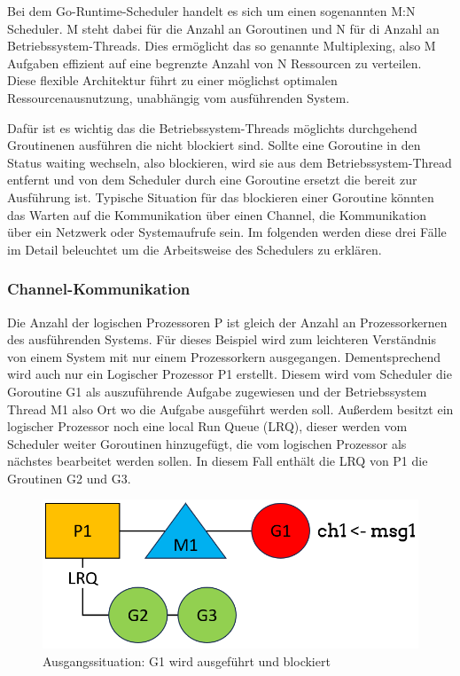 \documentclass[fontsize=12pt,paper=a4,twoside=semi,parskip=half-,headsepline,headinclude]{scrreprt}
\begin{document}
Bei dem Go-Runtime-Scheduler handelt es sich um einen sogenannten M:N Scheduler. M steht dabei für die Anzahl an Goroutinen und N für di Anzahl an Betriebssystem-Threads. Dies ermöglicht das so genannte Multiplexing, also M Aufgaben effizient auf eine begrenzte Anzahl von N Ressourcen zu verteilen. Diese flexible Architektur führt zu einer möglichst optimalen Ressourcenausnutzung, unabhängig vom ausführenden System.

Dafür ist es wichtig das die Betriebssystem-Threads möglichts durchgehend Groutinenen ausführen die nicht blockiert sind. Sollte eine Goroutine in den Status waiting wechseln, also blockieren, wird sie aus dem Betriebssystem-Thread entfernt und von dem Scheduler durch eine Goroutine ersetzt die bereit zur Ausführung ist. Typische Situation für das blockieren einer Goroutine könnten das Warten auf die Kommunikation über einen Channel, die Kommunikation über ein Netzwerk oder Systemaufrufe sein. Im folgenden werden diese drei Fälle im Detail beleuchtet um die Arbeitsweise des Schedulers zu erklären.

\subsubsection{Channel-Kommunikation}

Die Anzahl der logischen Prozessoren P ist gleich der Anzahl an Prozessorkernen des ausführenden Systems. Für dieses Beispiel wird zum leichteren Verständnis von einem System mit nur einem Prozessorkern ausgegangen. Dementsprechend wird auch nur ein Logischer Prozessor P1 erstellt. Diesem wird vom Scheduler die Goroutine G1 als auszuführende Aufgabe zugewiesen und der Betriebssystem Thread M1 also Ort wo die Aufgabe ausgeführt werden soll. Außerdem besitzt ein logischer Prozessor noch eine local Run Queue (LRQ), dieser werden vom Scheduler weiter Goroutinen hinzugefügt, die vom logischen Prozessor als nächstes bearbeitet werden sollen. In diesem Fall enthält die LRQ von P1 die Groutinen G2 und G3.

\begin{figure}[h]
	\centering
	\includegraphics[scale=0.5]{figures/GoroutineChannel1.png}
	\caption{Ausgangssituation: G1 wird ausgeführt und blockiert}
	\label{fig:GoroutineChannel1}
\end{figure}
\end{document}
